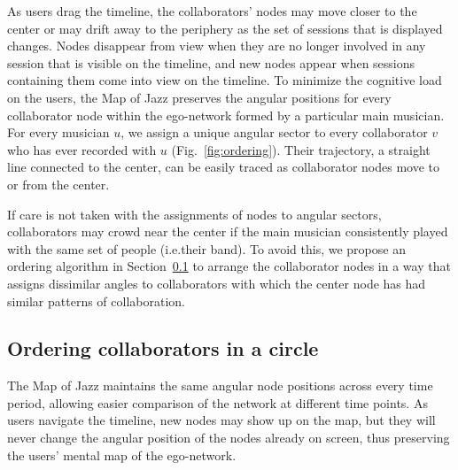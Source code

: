 \documentclass[12pt]{cmuthesis}
\begin{document}
  As users drag the timeline, the collaborators' nodes may move closer to the
  center or may drift away to the periphery as the set of sessions that is
  displayed changes. Nodes disappear from view when they are no longer involved in
  any session that is visible on the timeline, and new nodes appear when sessions
  containing them come into view on the timeline. To minimize the cognitive load
  on the users, the Map of Jazz preserves the angular positions for every
  collaborator node within the ego-network formed by a particular main musician.
  For every musician $u$, we assign a unique angular sector to every collaborator
  $v$ who has ever recorded with $u$ (Fig.~\ref{fig:ordering}). Their trajectory,
  a straight line connected to the center, can be easily traced as collaborator
  nodes move to or from the center.

  If care is not taken with the assignments of nodes to angular sectors, collaborators may
  crowd near the center if the main musician consistently played with the same
  set of people (i.e.\@ their band). To avoid this, we propose an ordering
  algorithm in Section~\ref{sec:ordering} to arrange the collaborator nodes in a
  way that assigns dissimilar angles to collaborators with which the center node
  has had similar patterns of collaboration.




  \subsection{Ordering collaborators in a circle}
  \label{sec:ordering}


  The Map of Jazz maintains the same angular node positions across every time
  period, allowing easier comparison of the network at different time points. As
  users navigate the timeline, new nodes may show up on the map, but they will
  never change the angular position of the nodes already on screen, thus
  preserving the users' mental map of the ego-network.
\end{document}
